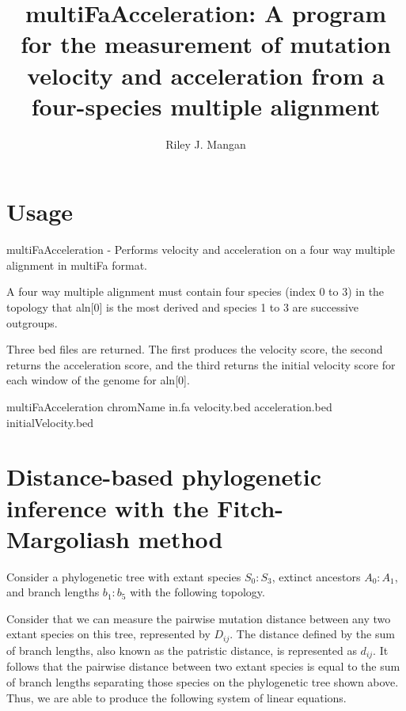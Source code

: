 \documentclass{article} %
\begin{document}
\title{multiFaAcceleration: A program for the measurement of mutation velocity and acceleration from a four-species multiple alignment}
\author{Riley J. Mangan}
\maketitle

\section{Usage}
multiFaAcceleration - Performs velocity and acceleration on a four way multiple alignment in multiFa format.\par
A four way multiple alignment must contain four species (index 0 to 3) in the topology that aln[0] is the most derived and species 1 to 3 are successive outgroups.\par
Three bed files are returned. The first produces the velocity score, the second returns the acceleration score, and the third returns the initial velocity score for each window of the genome for aln[0].\par
multiFaAcceleration chromName in.fa velocity.bed acceleration.bed initialVelocity.bed\par

\section{Distance-based phylogenetic inference with the Fitch-Margoliash method}

Consider a phylogenetic tree with extant species $S_0:S_3$, extinct ancestors $A_0:A_1$, and branch lengths $b_1:b_5$ with the following topology.\par

\begin{center}
\end{center}

Consider that we can measure the pairwise mutation distance between any two extant species on this tree, represented by $D_{ij}$. The distance defined by the sum of branch lengths, also known as the patristic distance, is represented as $d_{ij}$. It follows that the pairwise distance between two extant species is equal to the sum of branch lengths separating those species on the phylogenetic tree shown above. Thus, we are able to produce the following system of linear equations.
\end{document}
